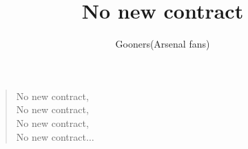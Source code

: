 \documentclass[a4paper,12pt]{article}
\title{No new contract}
\author{Gooners(Arsenal fans)}
\date{}
\begin{document}
	
	\maketitle
	
	\begin{verse}
		
		No new contract, \\
		No new contract, \\
		No new contract, \\
		No new contract$\ldots$
		
	\end{verse}
	
\end{document}
